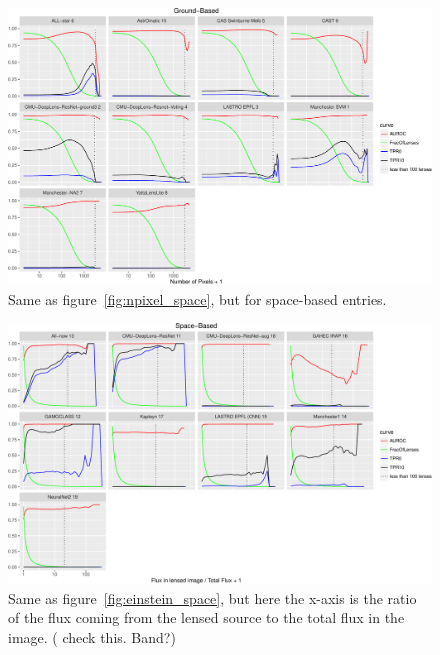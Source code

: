 \documentclass[useAMS,usenatbib]{mnras}
\newcommand{\red}[1]{{\color{red} #1}}
\begin{document}
\begin{figure}
 \includegraphics[width=2\columnwidth]{figures/npixel_ground.pdf}
 \caption{Same as figure~\ref{fig:npixel_space}, but for space-based entries.}
 \label{fig:npixel_ground}
\end{figure}

\begin{figure}
 \includegraphics[width=2\columnwidth]{figures/flux_contrast_space.pdf}
  \caption{Same as figure~\ref{fig:einstein_space}, but here the x-axis is the ratio of the flux coming from the lensed source to the total flux in the image.  (\red{ check this.  Band?})}
 \label{fig:flux_contrast_space}
\end{figure}
\end{document}
